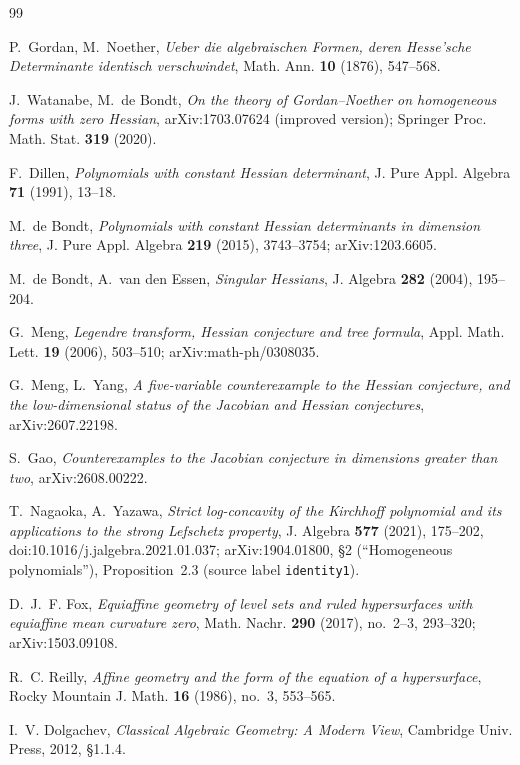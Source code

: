\documentclass[11pt]{article}
\theoremstyle{plain}
\theoremstyle{definition}
\begin{document}
\begin{thebibliography}{99}

 P.~Gordan, M.~Noether, \emph{Ueber die algebraischen
Formen, deren Hesse'sche Determinante identisch verschwindet}, Math.
Ann. \textbf{10} (1876), 547--568.

 J.~Watanabe, M.~de Bondt, \emph{On the theory of
Gordan--Noether on homogeneous forms with zero Hessian},
arXiv:1703.07624 (improved version); Springer Proc. Math. Stat.
\textbf{319} (2020).

 F.~Dillen, \emph{Polynomials with constant Hessian
determinant}, J. Pure Appl. Algebra \textbf{71} (1991), 13--18.

 M.~de Bondt, \emph{Polynomials with constant
Hessian determinants in dimension three}, J. Pure Appl. Algebra
\textbf{219} (2015), 3743--3754; arXiv:1203.6605.

 M.~de Bondt, A.~van den Essen, \emph{Singular
Hessians}, J. Algebra \textbf{282} (2004), 195--204.

 G.~Meng, \emph{Legendre transform, Hessian
conjecture and tree formula}, Appl. Math. Lett. \textbf{19} (2006),
503--510; arXiv:math-ph/0308035.

 G.~Meng, L.~Yang, \emph{A five-variable
counterexample to the Hessian conjecture, and the low-dimensional
status of the Jacobian and Hessian conjectures}, arXiv:2607.22198.

 S.~Gao, \emph{Counterexamples to the Jacobian conjecture
in dimensions greater than two}, arXiv:2608.00222.

 T.~Nagaoka, A.~Yazawa, \emph{Strict log-concavity of the
Kirchhoff polynomial and its applications to the strong Lefschetz
property}, J. Algebra \textbf{577} (2021), 175--202,
doi:10.1016/j.jalgebra.2021.01.037; arXiv:1904.01800, \S2
(``Homogeneous polynomials''), Proposition~2.3 (source label
\texttt{identity1}).

 D.~J.~F. Fox, \emph{Equiaffine geometry of level sets
and ruled hypersurfaces with equiaffine mean curvature zero}, Math.
Nachr. \textbf{290} (2017), no.~2--3, 293--320; arXiv:1503.09108.

 R.~C. Reilly, \emph{Affine geometry and the form of
the equation of a hypersurface}, Rocky Mountain J. Math. \textbf{16}
(1986), no.~3, 553--565.

 I.~V. Dolgachev, \emph{Classical Algebraic
Geometry: A Modern View}, Cambridge Univ. Press, 2012, \S1.1.4.


\end{thebibliography}
\end{document}
